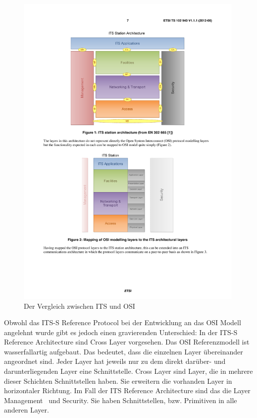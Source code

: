 \begin{figure}[h]
	\includegraphics[width=0.99\textwidth]{content/images/02_architektur/vergleichITS-OSI.pdf}
	\caption{Der Vergleich zwischen ITS und OSI \cite{ts102940}}
	\label{fig:architektur_vergleichItsOsi}
\end{figure}

Obwohl das \ac{ITS-S} Reference Protocol bei der Entwicklung an das \ac{OSI} Modell angelehnt wurde gibt es jedoch einen gravierenden Unterschied: In der \ac{ITS-S} Reference Architecture sind Cross Layer vorgesehen. Das \ac{OSI} Referenzmodell ist wasserfallartig aufgebaut. Das bedeutet, dass die einzelnen Layer übereinander angeordnet sind. Jeder Layer hat jeweils nur zu dem direkt darüber- und darunterliegenden Layer eine Schnittstelle. Cross Layer sind Layer, die in mehrere dieser Schichten Schnittstellen haben. Sie erweitern die vorhanden Layer in horizontaler Richtung. Im Fall der \ac{ITS} Reference Architecture sind das die Layer \glqq Management\grqq~ und \glqq Security\grqq. Sie haben Schnittstellen, bzw. Primitiven in alle anderen Layer. 


